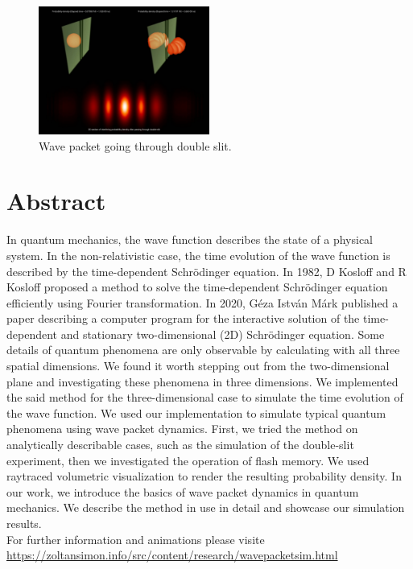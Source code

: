 \begin{figure}[H]
	\centering
	\includegraphics[width=0.5\textwidth]{"figures/preview_image.jpeg"}
	\caption{Wave packet going through double slit.}
	\label{fig:penetrating_potential}
\end{figure}

\section*{Abstract}

In quantum mechanics, the wave function describes the state of a physical system. In the non-relativistic case, the time evolution of the wave function is described by the time-dependent Schrödinger equation. In 1982, D Kosloff and R Kosloff proposed a method \cite{KOSLOFF198335} to solve the time-dependent Schrödinger equation efficiently using Fourier transformation. In 2020, Géza István Márk published a paper \cite{mark2020webschrodinger} describing a computer program for the interactive solution of the time-dependent and stationary two-dimensional (2D) Schrödinger equation. Some details of quantum phenomena are only observable by calculating with all three spatial dimensions. We found it worth stepping out from the two-dimensional plane and investigating these phenomena in three dimensions. We implemented the said method for the three-dimensional case to simulate the time evolution of the wave function. We used our implementation to simulate typical quantum phenomena using wave packet dynamics. First, we tried the method on analytically describable cases, such as the simulation of the double-slit experiment, then we investigated the operation of flash memory. We used raytraced volumetric visualization to render the resulting probability density. In our work, we introduce the basics of wave packet dynamics in quantum mechanics. We describe the method in use in detail and showcase our simulation results.\\
For further information and animations please visite\\ \url{https://zoltansimon.info/src/content/research/wavepacketsim.html}

